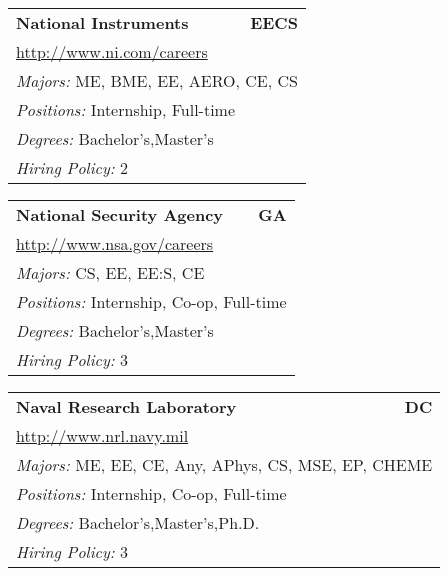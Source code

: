 \documentclass[twoside]{article}
\begin{document}
\begin{center}
\begin{multicols}{3}
\begin{FlushLeft}
\begin{minipage}{.9\columnwidth}
\end{minipage}
 
\begin{minipage}{.9\columnwidth}\begin{tabularx}{.95\columnwidth}{Xr}
                 {\Large\bf National Instruments} & {\Large\bf EECS}\\
    \multicolumn{2}{p{.95\columnwidth}}{\url{http://www.ni.com/careers}}\\
    \multicolumn{2}{p{.95\columnwidth}}{\emph{Majors:} ME, BME, EE, AERO, CE, CS}\\
    \multicolumn{2}{p{.95\columnwidth}}{\emph{Positions:} Internship, Full-time}\\
    \multicolumn{2}{p{.95\columnwidth}}{\emph{Degrees:} Bachelor's,Master's}\\
    \multicolumn{2}{p{.95\columnwidth}}{\emph{Hiring Policy:} 2}\\
    \end{tabularx}
    
\end{minipage}
 
\begin{minipage}{.9\columnwidth}\begin{tabularx}{.95\columnwidth}{Xr}
                 {\Large\bf National Security Agency} & {\Large\bf GA}\\
    \multicolumn{2}{p{.95\columnwidth}}{\url{http://www.nsa.gov/careers}}\\
    \multicolumn{2}{p{.95\columnwidth}}{\emph{Majors:} CS, EE, EE:S, CE}\\
    \multicolumn{2}{p{.95\columnwidth}}{\emph{Positions:} Internship, Co-op, Full-time}\\
    \multicolumn{2}{p{.95\columnwidth}}{\emph{Degrees:} Bachelor's,Master's}\\
    \multicolumn{2}{p{.95\columnwidth}}{\emph{Hiring Policy:} 3}\\
    \end{tabularx}
    
\end{minipage}
 
\begin{minipage}{.9\columnwidth}\begin{tabularx}{.95\columnwidth}{Xr}
                 {\Large\bf Naval Research Laboratory} & {\Large\bf DC}\\
    \multicolumn{2}{p{.95\columnwidth}}{\url{http://www.nrl.navy.mil}}\\
    \multicolumn{2}{p{.95\columnwidth}}{\emph{Majors:} ME, EE, CE, Any, APhys, CS, MSE, EP, CHEME}\\
    \multicolumn{2}{p{.95\columnwidth}}{\emph{Positions:} Internship, Co-op, Full-time}\\
    \multicolumn{2}{p{.95\columnwidth}}{\emph{Degrees:} Bachelor's,Master's,Ph.D.}\\
    \multicolumn{2}{p{.95\columnwidth}}{\emph{Hiring Policy:} 3}\\
    \end{tabularx}
    

\end{minipage}
\end{FlushLeft}
\end{multicols}
\end{center}
\end{document}
